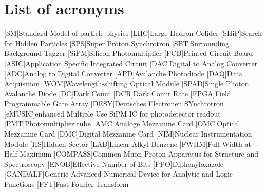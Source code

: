 \documentclass[listof=totoc,bibliography=totocnumbered,a4paper,english,12pt,twoside]{report}
\begin{document}
\onehalfspacing





\newpage
\thispagestyle{empty}
\mbox{}\newpage
{}

\thispagestyle{empty}
\mbox{}\newpage
\thispagestyle{empty}


\thispagestyle{empty}
\newpage
\thispagestyle{empty}
\mbox{}\newpage

\setcounter{page}{1}
\tableofcontents

\newpage







\appendix

\chapter{List of acronyms}
\begin{acronym}[GANDALF]
    [SM]{Standard Model of particle physics}
    [LHC]{Large Hadron Colider}
    [SHiP]{Search for Hidden Particles}
    [SPS]{Super Proton Synchrotron}
    [SBT]{Surrounding Background Tagger}
    [SiPM]{Silicon Photomultiplier}
    [PCB]{Printed Circuit Board}
    [ASIC]{Application Specific Integrated Circuit}
    [DAC]{Digital to Analog Converter}
    [ADC]{Analog to Digital Converter}
    [APD]{Avalanche Photodiode}
    [DAQ]{Data Acquisition}
    [WOM]{Wavelength-shifting Optical Module}
    [SPAD]{Single Photon Avalanche Diode}
    [DC]{Dark Count}
    [DCR]{Dark Count Rate}
    [FPGA]{Field Programmable Gate Array}
    [DESY]{Deutsches Electronen SYnchrotron}
    [eMUSIC]{enhanced Multiple Use SiPM IC for photodetector readout}
    [PMT]{Photomultiplier tube}
    [AMC]{Analoge Mezzanine Card}
    [OMC]{Optical Mezzanine Card}
    [DMC]{Digital Mezzanine Card}
    [NIM]{Nuclear Instrumentation Module}
    [HS]{Hidden Sector}
    [LAB]{Linear Alkyl Benzene}
    [FWHM]{Full Width at Half Maximum}
    [COMPASS]{Common Muon Proton Apparatus for Structure and Spectroscopy}
    [ENOB]{Effective Number of Bits}
    [PPO]{Diphenyloxazole}
    [GANDALF]{Generic Advanced Numerical Device for Analytic and Logic Functions}
    [FFT]{Fast Fourier Transform}
\end{acronym}
\end{document}
